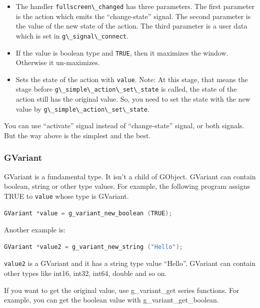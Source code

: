 \begin{itemize}
\tightlist
\item
  The handler \passthrough{\lstinline!fullscreen\_changed!} has three
  parameters. The first parameter is the action which emits the
  ``change-state'' signal. The second parameter is the value of the new
  state of the action. The third parameter is a user data which is set
  in \passthrough{\lstinline!g\_signal\_connect!}.
\item
  If the value is boolean type and \passthrough{\lstinline!TRUE!}, then
  it maximizes the window. Otherwise it un-maximizes.
\item
  Sets the state of the action with \passthrough{\lstinline!value!}.
  Note: At this stage, that means the stage before
  \passthrough{\lstinline!g\_simple\_action\_set\_state!} is called, the
  state of the action still has the original value. So, you need to set
  the state with the new value by
  \passthrough{\lstinline!g\_simple\_action\_set\_state!}.
\end{itemize}

You can use ``activate'' signal instead of ``change-state'' signal, or
both signals. But the way above is the simplest and the best.

\subsubsection{GVariant}\label{gvariant}

GVariant is a fundamental type. It isn't a child of GObject. GVariant
can contain boolean, string or other type values. For example, the
following program assigns TRUE to \passthrough{\lstinline!value!} whose
type is GVariant.

\begin{lstlisting}[language=C]
GVariant *value = g_variant_new_boolean (TRUE);
\end{lstlisting}

Another example is:

\begin{lstlisting}[language=C]
GVariant *value2 = g_variant_new_string ("Hello");
\end{lstlisting}

\passthrough{\lstinline!value2!} is a GVariant and it has a string type
value ``Hello''. GVariant can contain other types like int16, int32,
int64, double and so on.

If you want to get the original value, use g\_variant\_get series
functions. For example, you can get the boolean value with
g\_variant\_get\_boolean.

